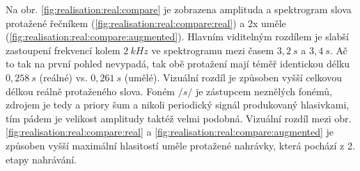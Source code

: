 Na obr. \ref{fig:realisation:real:compare} je zobrazena amplituda a spektrogram slova  protažené řečníkem (\ref{fig:realisation:real:compare:real}) a 2x uměle (\ref{fig:realisation:real:compare:augmented}). Hlavním viditelným rozdílem je slabší zastoupení frekvencí kolem $2\ kHz$ ve spektrogramu mezi časem $3,2\ s$ a $3,4\ s$. Ač to tak na první pohled nevypadá, tak obě protažení mají téměř identickou délku $0,258\ s$ (reálné) vs. $0,261\ s$ (umělé). Vizuální rozdíl je způsoben vyšší celkovou délkou reálně protaženého slova. Foném $/s/$ je zástupcem neznělých fonémů, zdrojem je tedy a priory šum a nikoli periodický signál produkovaný hlasivkami, tím pádem je velikost amplitudy taktéž velmi podobná. Vizuální rozdíl mezi obr. \ref{fig:realisation:real:compare:real} a \ref{fig:realisation:real:compare:augmented} je způsoben vyšší maximální hlasitostí uměle protažené nahrávky, která pochází z 2. etapy nahrávání.

